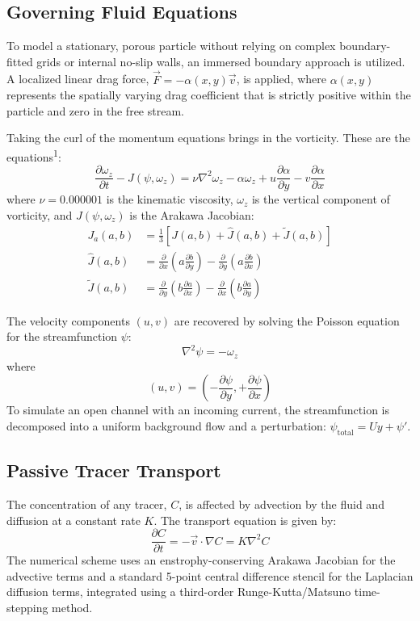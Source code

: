 \documentclass{article}
\begin{document}
\subsection{Governing Fluid Equations}
To model a stationary, porous particle without relying on complex boundary-fitted grids or internal no-slip walls, an immersed boundary approach is utilized. A localized linear drag force, $\vec{F} = -\alpha(x,y) \vec{v}$, is applied, where $\alpha(x,y)$ represents the spatially varying drag coefficient that is strictly positive within the particle and zero in the free stream.

Taking the curl of the momentum equations brings in the vorticity. These are the equations\textsuperscript{1}:
\begin{equation}
    \frac{\partial \omega_z}{\partial t} - J(\psi, \omega_z) = \nu \nabla^2 \omega_z - \alpha \omega_z + u \frac{\partial \alpha}{\partial y} - v \frac{\partial \alpha}{\partial x}
\end{equation}
where $\nu=0.000001$ is the kinematic viscosity, $\omega_z$ is the vertical component of vorticity, and $J(\psi,\omega_z)$ is the Arakawa Jacobian:
\begin{align*}
    J_{a}(a, b) &= \frac{1}{3} \left[ J(a, b) + \hat{J}(a, b) + \tilde{J}(a, b) \right] \\
\hat{J}(a, b) &= \frac{\partial}{\partial x} \left( a \frac{\partial b}{\partial y} \right) - \frac{\partial}{\partial y} \left( a \frac{\partial b}{\partial x} \right) \\
\tilde{J}(a, b) &= \frac{\partial}{\partial y} \left( b \frac{\partial a}{\partial x} \right) - \frac{\partial}{\partial x} \left( b \frac{\partial a}{\partial y} \right)
\end{align*}


The velocity components $(u,v)$ are recovered by solving the Poisson equation for the streamfunction $\psi$:
\begin{equation}
    \nabla^2 \psi = -\omega_z
\end{equation}
where
\begin{equation}
    (u,v) = \left(-\frac{\partial \psi}{\partial y}, +\frac{\partial \psi}{\partial x}\right)
\end{equation}
To simulate an open channel with an incoming current, the streamfunction is decomposed into a uniform background flow and a perturbation: $\psi_{\text{total}} = U y + \psi'$.



\subsection{Passive Tracer Transport}
The concentration of any tracer, $C$, is affected by advection by the fluid and diffusion at a constant rate $K$. The transport equation is given by:
\begin{equation}
    \frac{\partial C}{\partial t} =- \vec{v} \cdot \nabla C = K \nabla^2 C
\end{equation}
The numerical scheme uses an enstrophy-conserving Arakawa Jacobian for the advective terms and a standard 5-point central difference stencil for the Laplacian diffusion terms, integrated using a third-order Runge-Kutta/Matsuno time-stepping method.
\end{document}
